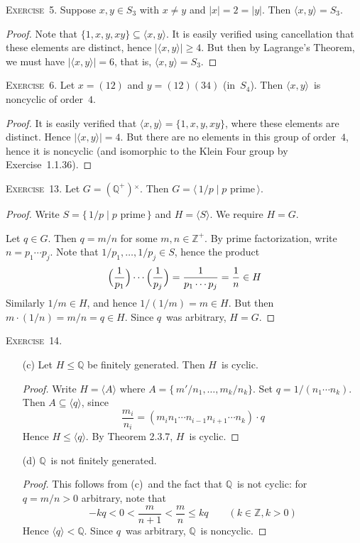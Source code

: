\documentclass[letterpaper]{article}
\newcommand{\exercise}[1]{\goodbreak\noindent\textsc{Exercise~{#1}.}}
\newcommand{\Z}{\mathbb{Z}}
\newcommand{\Q}{\mathbb{Q}}
\newcommand{\subgroup}{\le}
\newcommand{\mi}[1]{{#1}{}^{\times}}
\newcommand{\ord}[1]{|{#1}|}
\newcommand{\gen}[1]{\langle{#1}\rangle}
\begin{document}
\bigskip
\exercise{5}
Suppose $x,y\in S_3$ with $x\ne y$ and $\ord{x}=2=\ord{y}$. Then $\gen{x,y}=S_3$.
\begin{proof}
Note that $\{1,x,y,xy\}\subseteq\gen{x,y}$. It is easily verified using cancellation that these elements are distinct, hence $\ord{\gen{x,y}}\ge 4$. But then by Lagrange's Theorem, we must have $\ord{\gen{x,y}}=6$, that is, $\gen{x,y}=S_3$.
\end{proof}

\exercise{6}
Let $x=(12)$ and $y=(12)(34)$ (in~$S_4$). Then $\gen{x,y}$~is noncyclic of order~$4$.
\begin{proof}
It is easily verified that $\gen{x,y}=\{1,x,y,xy\}$, where these elements are distinct. Hence $\ord{\gen{x,y}}=4$. But there are no elements in this group of order~$4$, hence it is noncyclic (and isomorphic to the Klein Four group by Exercise~1.1.36).
\end{proof}

\exercise{13}
Let $G=\mi{(\Q^{+})}$. Then $G=\gen{\,1/p\mid p\text{ prime}\,}$.
\begin{proof}
Write $S=\{\,1/p\mid p\text{ prime}\,\}$ and $H=\gen{S}$. We require $H=G$.

Let $q\in G$. Then $q=m/n$ for some $m,n\in\Z^+$. By prime factorization, write $n=p_1\cdots p_j$. Note that $1/p_1,\ldots,1/p_j\in S$, hence the product
$$\Bigl(\frac{1}{p_1}\Bigr)\cdots\Bigl(\frac{1}{p_j}\Bigr)=\frac{1}{p_1\cdots p_j}=\frac{1}{n}\in H$$
Similarly $1/m\in H$, and hence $1/(1/m)=m\in H$. But then $m\cdot(1/n)=m/n=q\in H$. Since $q$~was arbitrary, $H=G$.
\end{proof}

\exercise{14}
\begin{enumerate}[itemsep=0pt]
\item[(c)] Let $H\subgroup\Q$ be finitely generated. Then $H$~is cyclic.
\begin{proof}
Write $H=\gen{A}$ where $A=\{\,m'/n_1,\ldots,m_k/n_k\}$. Set $q=1/(n_1\cdots n_k)$. Then $A\subseteq\gen{q}$, since
$$\frac{m_i}{n_i}=(m_i n_1\cdots n_{i-1}n_{i+1}\cdots n_k)\cdot q$$
Hence $H\subgroup\gen{q}$. By Theorem 2.3.7, $H$~is cyclic.
\end{proof}
\item[(d)] $\Q$~is not finitely generated.
\begin{proof}
This follows from (c)~and the fact that $\Q$~is not cyclic: for $q=m/n>0$ arbitrary, note that
$$-kq<0<\frac{m}{n+1}<\frac{m}{n}\le kq\qquad (k\in\Z, k>0)$$
Hence $\gen{q}<\Q$. Since $q$~was arbitrary, $\Q$~is noncyclic.
\end{proof}
\end{enumerate}
\end{document}
